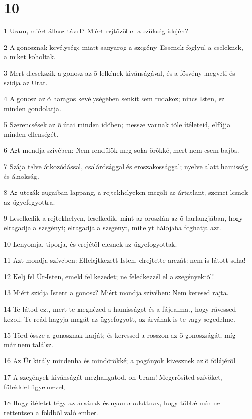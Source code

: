 \chapter{10}

\par 1 Uram, miért állasz távol? Miért rejtõzöl el a szükség idején?
\par 2 A gonosznak kevélysége miatt sanyarog a szegény. Essenek foglyul a cseleknek, a miket koholtak.
\par 3 Mert dicsekszik a gonosz az õ lelkének kivánságával, és a fösvény megveti és szidja az Urat.
\par 4 A gonosz az õ haragos kevélységében senkit sem tudakoz; nincs Isten, ez minden gondolatja.
\par 5 Szerencsések az õ útai minden idõben; messze vannak tõle ítéleteid, elfújja minden ellenségét.
\par 6 Azt mondja szívében: Nem rendülök meg soha örökké, mert nem esem bajba.
\par 7 Szája telve átkozódással, csalárdsággal és erõszakossággal; nyelve alatt hamisság és álnokság.
\par 8 Az utczák zugaiban lappang, a rejtekhelyeken megöli az ártatlant, szemei lesnek az ügyefogyottra.
\par 9 Leselkedik a rejtekhelyen, leselkedik, mint az oroszlán az õ barlangjában, hogy elragadja a szegényt; elragadja a szegényt, mihelyt hálójába foghatja azt.
\par 10 Lenyomja, tiporja, és erejétõl elesnek az ügyefogyottak.
\par 11 Azt mondja szívében: Elfelejtkezett Isten, elrejtette arczát: nem is látott soha!
\par 12 Kelj fel Úr-Isten, emeld fel kezedet; ne feledkezzél el a szegényekrõl!
\par 13 Miért szidja Istent a gonosz? Miért mondja szívében: Nem keresed rajta.
\par 14 Te látod ezt, mert te megnézed a hamisságot és a fájdalmat, hogy rávessed kezed. Te reád hagyja magát az ügyefogyott, az árvának is te vagy segedelme.
\par 15 Törd össze a gonosznak karját; és keressed a rosszon az õ gonoszságát, míg már nem találsz.
\par 16 Az Úr király mindenha és mindörökké; a pogányok kivesznek az õ földjérõl.
\par 17 A szegények kivánságát meghallgatod, oh Uram! Megerõsíted szívöket, füleiddel figyelmezel,
\par 18 Hogy ítéletet tégy az árvának és nyomorodottnak, hogy többé már ne rettentsen a földbõl való ember.

